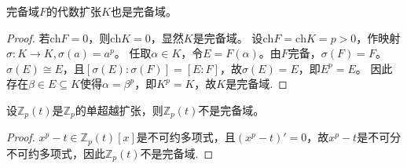 \documentclass[../../main.tex]{subfiles}%
\begin{document}
\begin{corollary}
完备域$F$的代数扩张$K$也是完备域。
\end{corollary}

\begin{proof}

若$\mathrm{ch}F=0$，则$\mathrm{ch}K=0$，显然$K$是完备域。
设$\mathrm{ch}F=\mathrm{ch}K=p>0$，作映射$\sigma:K\to K,\sigma(a)=a^p$。
任取$\alpha\in K$，令$E=F(\alpha)$。由$F$完备，$\sigma(F)=F$。
$\sigma(E)\cong E$，且$[\sigma(E):\sigma(F)]=[E:F]$，故$\sigma(E)=E$，即$E^p=E$。
因此存在$\beta\in E\subseteq K$使得$\alpha=\beta^p$，即$K^p=K$，故$K$是完备域.

\end{proof}

\begin{corollary}
设$\mathbb{Z}_p(t)$是$\mathbb{Z}_p$的单超越扩张，则$\mathbb{Z}_p(t)$不是完备域。
\end{corollary}

\begin{proof}

$x^p-t\in\mathbb{Z}_p(t)[x]$是不可约多项式，且$(x^p-t)'=0$，故$x^p-t$是不可分不可约多项式，因此$\mathbb{Z}_p(t)$不是完备域.

\end{proof}
\end{document}
